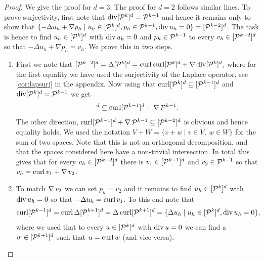 \documentclass[pdflatex,sn-mathphys,Numbered]{sn-jnl}%
\theoremstyle{remark}%
\theoremstyle{definition}%
\begin{document}
\begin{proof}
  We give the proof for $d=3$. The proof for $d=2$ follows similar lines. 
  To prove surjectivity, first note that $\operatorname{\mathrm{div}} [\mathcal{P}^{k}]^d = \mathcal{P}^{k-1}$ and hence it remains only to show that $\{-\Delta u_h + \nabla p_h \mid u_h\in[\mathcal{P}^k]^d, p_h\in\mathcal{P}^{k-1}, \operatorname{\mathrm{div}} u_h=0\}=[\mathcal{P}^{k-2}]^d$. The task is hence to find $u_h \in [\mathcal{P}^k]^d$ with $\operatorname{\mathrm{div}} u_h = 0$ and $p_h \in \mathcal{P}^{k-1}$ to every $v_h\in [\mathcal{P}^{k-2}]^d$ so that $-\Delta u_h + \nabla p_h = v_h$. We prove this in two steps.
\begin{enumerate}
    \item
    First we note that
    $[\mathcal{P}^{k-2}]^d=\Delta [\mathcal{P}^{k}]^d=\operatorname{\mathrm{curl}}\operatorname{\mathrm{curl}}[\mathcal{P}^{k}]^d + \operatorname{\nabla}\operatorname{\mathrm{div}}[\mathcal{P}^{k}]^d,$
    where for the first equality we have used the surjectivity of the Laplace operator, see \cref{cor:lapsurj} in the appendix.
    Now using that  $\operatorname{\mathrm{curl}}[\mathcal{P}^{k}]^d \subseteq [\mathcal{P}^{k-1}]^d$ and $\operatorname{\mathrm{div}}[\mathcal{P}^{k}]^d = \mathcal{P}^{k-1}$ we get 
    \begin{equation*}
      [\cP^{k-2}]^d \subseteq \Curl[\cP^{k-1}]^d + \Grad\cP^{k-1}.
    \end{equation*}
    The other direction, $\operatorname{\mathrm{curl}}[\mathcal{P}^{k-1}]^d + \operatorname{\nabla}\mathcal{P}^{k-1}
    \subseteq [\mathcal{P}^{k-2}]^d$ is obvious and hence equality holds. We
    used the notation $V+W=\{v+w\mid v\in V,\ w\in W\}$ for the sum of
    two spaces. Note that this is not an orthogonal decomposition, and
    that the spaces considered here have a non-trivial intersection.
    In total this gives that for every $v_h\in [\mathcal{P}^{k-2}]^d$ there is
    $v_1 \in [\mathcal{P}^{k-1}]^d$ and $v_2 \in \mathcal{P}^{k-1}$ so that $v_h =
    \operatorname{\mathrm{curl}} v_1 + \operatorname{\nabla} v_2$.
    \item To match $\operatorname{\nabla} v_2$ we can set $p_h = v_2$ and it remains to find $u_h \in [\mathcal{P}^k]^d$ with $\operatorname{\mathrm{div}} u_h = 0$ so that $-\Delta u_h = \operatorname{\mathrm{curl}} v_1$. 
    To this end note that 
    \begin{equation*}
      \operatorname{\mathrm{curl}} [\mathcal{P}^{k-1}]^d= \operatorname{\mathrm{curl}} \Delta [\mathcal{P}^{k+1}]^d=  \Delta \operatorname{\mathrm{curl}} [\mathcal{P}^{k+1}]^d = \{\Delta u_h\mid u_h\in[\mathcal{P}^{k}]^d, \operatorname{\mathrm{div}} u_h=0\},
    \end{equation*}
    where we used that to every $u\in[\mathcal{P}^{k}]^d$ with $\operatorname{\mathrm{div}} u=0$ we can find a $w\in[\mathcal{P}^{k+1}]^d$ such that $u=\operatorname{\mathrm{curl}} w$ (and vice versa).

\end{enumerate}
\end{proof}
\end{document}
